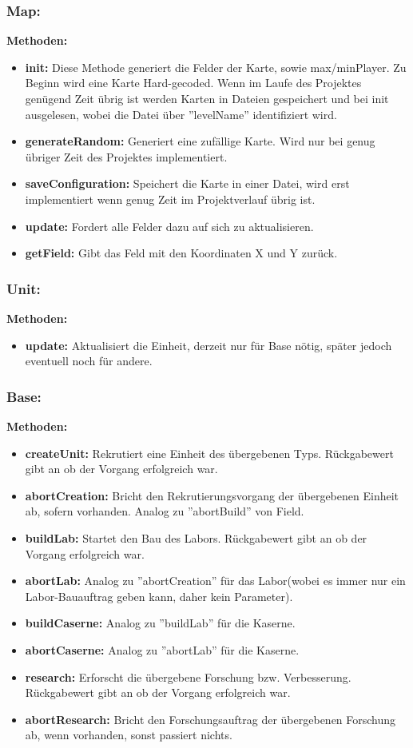 \documentclass[fontsize=12pt,paper=a4,twoside]{scrartcl}
\begin{document}
\subsubsection{Map:}
\textbf{Methoden:}
\begin{itemize}
	\item \textbf{init:} Diese Methode generiert die Felder der Karte, sowie max/minPlayer. Zu Beginn wird eine Karte Hard-gecoded. Wenn im Laufe des Projektes genügend Zeit übrig ist werden Karten in Dateien gespeichert und bei init ausgelesen, wobei die Datei über ''levelName'' identifiziert wird.
	\item \textbf{generateRandom:} Generiert eine zufällige Karte. Wird nur bei genug übriger Zeit des Projektes implementiert.
	\item \textbf{saveConfiguration:} Speichert die Karte in einer Datei, wird erst implementiert wenn genug Zeit im Projektverlauf übrig ist.
	\item \textbf{update:} Fordert alle Felder dazu auf sich zu aktualisieren.
	\item \textbf{getField:} Gibt das Feld mit den Koordinaten X und Y zurück.
\end{itemize}

\subsubsection{Unit:}
\textbf{Methoden:}
\begin{itemize}
	\item \textbf{update:} Aktualisiert die Einheit, derzeit nur für Base nötig, später jedoch eventuell noch für andere.
\end{itemize}


\subsubsection{Base:}
\textbf{Methoden:}
\begin{itemize}
	\item \textbf{createUnit:} Rekrutiert eine Einheit des übergebenen Typs. Rückgabewert gibt an ob der Vorgang erfolgreich war.
	\item \textbf{abortCreation:} Bricht den Rekrutierungsvorgang der übergebenen Einheit ab, sofern vorhanden. Analog zu ''abortBuild'' von Field.
	\item \textbf{buildLab:} Startet den Bau des Labors. Rückgabewert gibt an ob der Vorgang erfolgreich war.
	\item \textbf{abortLab:} Analog zu ''abortCreation'' für das Labor(wobei es immer nur ein Labor-Bauauftrag geben kann, daher kein Parameter).
	\item \textbf{buildCaserne:} Analog zu ''buildLab'' für die Kaserne.
	\item \textbf{abortCaserne:} Analog zu ''abortLab'' für die Kaserne.
	\item \textbf{research:} Erforscht die übergebene Forschung bzw. Verbesserung. Rückgabewert gibt an ob der Vorgang erfolgreich war.
	\item \textbf{abortResearch:} Bricht den Forschungsauftrag der übergebenen Forschung ab, wenn vorhanden, sonst passiert nichts.
\end{itemize}
\end{document}
